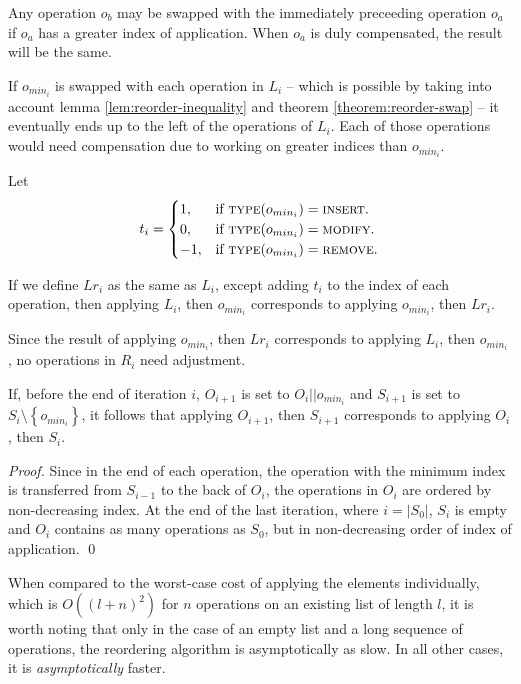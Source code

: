 \begin{theorem}
\label{theorem:reorder-swap}

Any operation $o_b$ may be swapped with the immediately preceeding operation
$o_a$ if $o_a$ has a greater index of application. When $o_a$ is duly
compensated, the result will be the same.

\end{theorem}

If $o_{min_i}$ is swapped with each operation in $L_i$ -- which is possible by
taking into account lemma \ref{lem:reorder-inequality} and theorem
\ref{theorem:reorder-swap} -- it eventually ends up to the left of the
operations of $L_i$. Each of those operations would need compensation due to
working on greater indices than $o_{min_i}$.

Let
\begin{equation*}
  t_i = 
  \begin{cases}
      1, & \text{if $\textsc{type}(o_{min_i}) = \textsc{insert}$}.\\
      0, & \text{if $\textsc{type}(o_{min_i}) = \textsc{modify}$}.\\
      -1, & \text{if $\textsc{type}(o_{min_i}) = \textsc{remove}$}.
  \end{cases}
\end{equation*}

If we define $Lr_i$ as the same as $L_i$, except adding $t_i$ to the index of
each operation, then applying $L_i$, then $o_{min_i}$ corresponds to applying
$o_{min_i}$, then $Lr_i$.

Since the result of applying $o_{min_i}$, then $Lr_i$ corresponds to applying
$L_i$, then $o_{min_i}$, no operations in $R_i$ need adjustment.

\begin{theorem}
\label{thm:end-of-iter}

If, before the end of iteration $i$, $O_{i+1}$ is set to $O_i || o_{min_i}$ and
$S_{i+1}$ is set to $S_i \setminus \left\{o_{min_i}\right\}$, it follows that
applying $O_{i+1}$, then $S_{i+1}$ corresponds to applying $O_i$, then $S_i$.

\end{theorem}

\begin{proof}

Since in the end of each operation, the operation with the minimum index is
transferred from $S_{i-1}$ to the back of $O_i$, the operations in $O_i$ are
ordered by non-decreasing index. At the end of the last iteration, where
$i=\left|S_0\right|$, $S_i$ is empty and $O_i$ contains as many operations as
$S_0$, but in non-decreasing order of index of application. \qed

\end{proof}

When compared to the worst-case cost of applying the elements individually,
which is $O\left(\left(l+n\right)^2\right)$ for $n$ operations on an existing
list of length $l$, it is worth noting that only in the case of an empty list
and a long sequence of operations, the reordering algorithm is asymptotically as
slow. In all other cases, it is \emph{asymptotically} faster.

